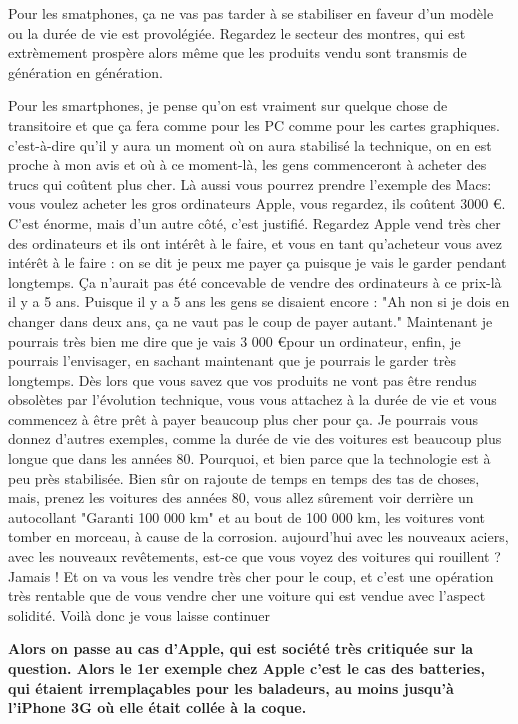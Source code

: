 \begin{small}
Pour les smatphones, ça ne vas pas tarder à se stabiliser en faveur d'un modèle ou la durée de vie est provolégiée. Regardez le secteur des montres, qui est extrèmement prospère alors même que les produits vendu sont transmis de génération en génération.

Pour les smartphones, je pense qu'on est vraiment sur quelque chose de transitoire et que ça fera comme pour les PC comme pour les cartes graphiques. c'est-à-dire qu'il y aura un moment où on aura stabilisé la technique, on en est proche à mon avis et où à ce moment-là, les gens commenceront à acheter des trucs qui coûtent plus cher. Là aussi vous pourrez prendre l'exemple des Macs: vous voulez acheter les gros ordinateurs Apple, vous regardez, ils coûtent 3000 \euro. C'est énorme, mais d'un autre côté, c'est justifié. Regardez Apple vend très cher des ordinateurs et ils ont intérêt à le faire, et vous en tant qu'acheteur vous avez intérêt à le faire : on se dit je peux me payer ça puisque je vais le garder pendant longtemps. Ça n'aurait pas été concevable de vendre des ordinateurs à ce prix-là il y a 5 ans. Puisque il y a 5 ans les gens se disaient encore : "Ah non si je dois en changer dans deux ans, ça ne vaut pas le coup de payer autant." Maintenant je pourrais très bien me dire que je vais 3 000 \euro pour un ordinateur, enfin, je pourrais l'envisager, en sachant maintenant que je pourrais le garder très longtemps. Dès lors que vous savez que vos produits ne vont pas être rendus obsolètes par l'évolution technique, vous vous attachez à la durée de vie et vous commencez à être prêt à payer beaucoup plus cher pour ça. 
Je pourrais vous donnez d'autres exemples, comme la durée de vie des voitures est beaucoup plus longue que dans les années 80. Pourquoi, et bien parce que la technologie est à peu près stabilisée. Bien sûr on rajoute de temps en temps des tas de choses, mais, prenez les voitures des années 80, vous allez sûrement voir derrière un autocollant "Garanti 100 000 km" et au bout de 100 000 km, les voitures vont tomber en morceau, à cause de la corrosion. aujourd'hui avec les nouveaux aciers, avec les nouveaux revêtements, est-ce que vous voyez des voitures qui rouillent ? Jamais ! Et on va vous les vendre très cher pour le coup, et c'est une opération très rentable que de vous vendre cher une voiture qui est vendue avec l'aspect solidité.
Voilà donc je vous laisse continuer


\textbf{Alors on passe au cas d'Apple, qui est société très critiquée sur la question. Alors le 1er exemple chez Apple c'est le cas des batteries, qui étaient irremplaçables pour les baladeurs, au moins jusqu’à l'iPhone 3G où elle était collée à la coque.}
\smallbreak



\end{small}
